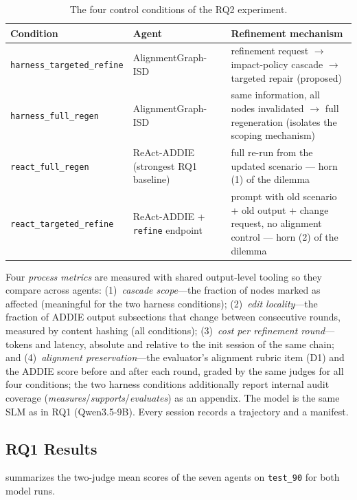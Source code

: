 \begin{table}[t]
  \caption{The four control conditions of the RQ2 experiment.}
  \label{tab:rq2-conditions}
  \begin{tabular}{@{}p{}p{}p{}@{}}
    \toprule
    Condition & Agent & Refinement mechanism \\
    \midrule
    \texttt{harness\_targeted\_refine} & AlignmentGraph-ISD & refinement request $\rightarrow$ impact-policy cascade $\rightarrow$ targeted repair (proposed) \\
    \texttt{harness\_full\_regen} & AlignmentGraph-ISD & same information, all nodes invalidated $\rightarrow$ full regeneration (isolates the scoping mechanism) \\
    \texttt{react\_full\_regen} & ReAct-ADDIE (strongest RQ1 baseline) & full re-run from the updated scenario --- horn (1) of the dilemma \\
    \texttt{react\_targeted\_refine} & ReAct-ADDIE + \texttt{refine} endpoint & prompt with old scenario + old output + change request, no alignment control --- horn (2) of the dilemma \\
    \bottomrule
  \end{tabular}
\end{table}

Four \emph{process metrics} are measured with shared output-level tooling so they compare across agents: (1)~\emph{cascade scope}---the fraction of nodes marked as affected (meaningful for the two harness conditions); (2)~\emph{edit locality}---the fraction of ADDIE output subsections that change between consecutive rounds, measured by content hashing (all conditions); (3)~\emph{cost per refinement round}---tokens and latency, absolute and relative to the init session of the same chain; and (4)~\emph{alignment preservation}---the evaluator's alignment rubric item (D1) and the ADDIE score before and after each round, graded by the same judges for all four conditions; the two harness conditions additionally report internal audit coverage (\textsl{measures}/\textsl{supports}/\textsl{evaluates}) as an appendix. The model is the same SLM as in RQ1 (Qwen3.5-9B). Every session records a trajectory and a manifest.

\subsection{RQ1 Results}
\label{sec:rq1-results}

 summarizes the two-judge mean scores of the seven agents on \texttt{test\_90} for both model runs.

